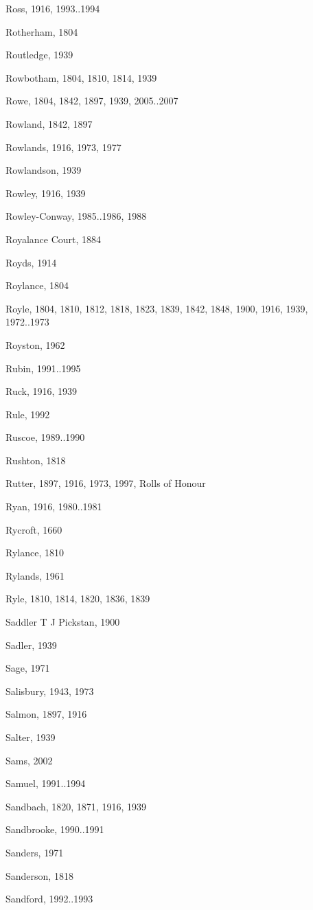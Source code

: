 {\begin{theindex}
\item Ross, 1916, 1993..1994
\item Rotherham, 1804
\item Routledge, 1939
\item Rowbotham, 1804, 1810, 1814, 1939
\item Rowe, 1804, 1842, 1897, 1939, 2005..2007
\item Rowland, 1842, 1897
\item Rowlands, 1916, 1973, 1977
\item Rowlandson, 1939
\item Rowley, 1916, 1939
\item Rowley-Conway, 1985..1986, 1988
\item Royalance Court, 1884
\item Royds, 1914
\item Roylance, 1804
\item Royle, 1804, 1810, 1812, 1818, 1823, 1839, 1842, 1848, 1900, 1916, 1939, 1972..1973
\item Royston, 1962
\item Rubin, 1991..1995
\item Ruck, 1916, 1939
\item Rule, 1992
\item Ruscoe, 1989..1990
\item Rushton, 1818
\item Rutter, 1897, 1916, 1973, 1997, Rolls of Honour
\item Ryan, 1916, 1980..1981
\item Rycroft, 1660
\item Rylance, 1810
\item Rylands, 1961
\item Ryle, 1810, 1814, 1820, 1836, 1839
\item Saddler T J Pickstan, 1900
\item Sadler, 1939
\item Sage, 1971
\item Salisbury, 1943, 1973
\item Salmon, 1897, 1916
\item Salter, 1939
\item Sams, 2002
\item Samuel, 1991..1994
\item Sandbach, 1820, 1871, 1916, 1939
\item Sandbrooke, 1990..1991
\item Sanders, 1971
\item Sanderson, 1818
\item Sandford, 1992..1993

\end{theindex}}
